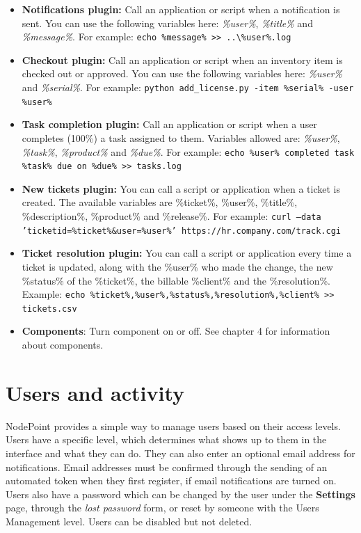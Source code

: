 \documentclass[11pt]{article}
\begin{document}
\begin{itemize}
\item \textbf{Notifications plugin:} Call an application or script when a notification is sent. You can use the following variables here: \textit{\%user\%}, \textit{\%title\%} and \textit{\%message\%}. For example: \texttt{echo \%message\% >> ..\textbackslash \%user\%.log}
\item \textbf{Checkout plugin:} Call an application or script when an inventory item is checked out or approved. You can use the following variables here: \textit{\%user\%} and \textit{\%serial\%}. For example: \texttt{python add\_license.py -item \%serial\% -user \%user\%}
\item \textbf{Task completion plugin:} Call an application or script when a user completes (100\%) a task assigned to them. Variables allowed are: \textit{\%user\%}, \textit{\%task\%}, \textit{\%product\%} and \textit{\%due\%}. For example: \texttt{echo \%user\% completed task \%task\% due on \%due\% >> tasks.log}
\item \textbf{New tickets plugin:} You can call a script or application when a ticket is created. The available variables are \%ticket\%, \%user\%, \%title\%, \%description\%, \%product\% and \%release\%. For example: \texttt{curl --data 'ticketid=\%ticket\%\&user=\%user\%' https://hr.company.com/track.cgi}
\item \textbf{Ticket resolution plugin:} You can call a script or application every time a ticket is updated, along with the \%user\% who made the change, the new \%status\% of the \%ticket\%, the billable \%client\% and the \%resolution\%. Example: \texttt{echo \%ticket\%,\%user\%,\%status\%,\%resolution\%,\%client\% >> tickets.csv}
\item \textbf{Components}: Turn component on or off. See chapter 4 for information about components.
\end{itemize}

\clearpage

\section{Users and activity}
NodePoint provides a simple way to manage users based on their access levels. Users have a specific level, which determines what shows up to them in the interface and what they can do. They can also enter an optional email address for notifications. Email addresses must be confirmed through the sending of an automated token when they first register, if email notifications are turned on. Users also have a password which can be changed by the user under the \textbf{Settings} page, through the \textit{lost password} form, or reset by someone with the Users Management level. Users can be disabled but not deleted.
\end{document}
